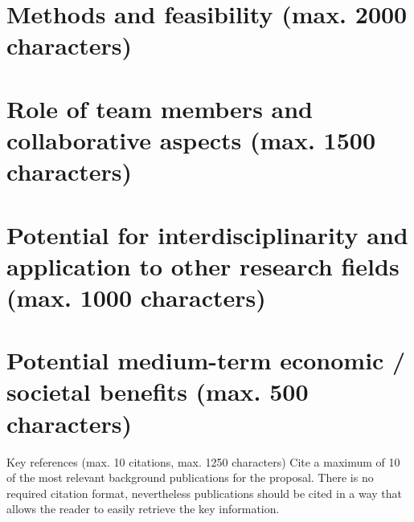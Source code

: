 \documentclass[a4paper,12pt]{article}
\begin{document}
\section{Methods and feasibility (max. 2000 characters)}

\section{Role of team members and collaborative aspects (max. 1500 characters)}

\section{Potential for interdisciplinarity and application to other research fields (max. 1000 characters)}

\section{Potential medium-term economic / societal benefits (max. 500 characters)}

Key references (max. 10 citations, max. 1250 characters)
Cite a maximum of 10 of the most relevant background publications for the proposal. There is no required citation format, nevertheless publications should be cited in a way that allows the reader to easily retrieve the key information.
\end{document}
